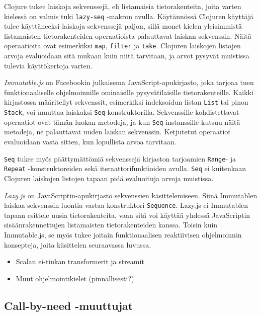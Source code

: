 Clojure tukee laiskoja sekvenssejä, eli listamaisia tietorakenteita, joita varten kielessä on valmis tuki \verb!lazy-seq! -makron avulla. Käytännössä Clojuren käyttäjä tulee käyttäneeksi laiskoja sekvenssejä paljon, sillä monet kielen yleisimmistä listamaisten tietorakenteiden operaatioista palauttavat laiskan sekvenssin. Näitä operaatioita ovat esimerkiksi \verb!map!, \verb!filter! ja \verb!take!. Clojuren laiskojen listojen arvoja evaluoidaan sitä mukaan kuin niitä tarvitaan, ja arvot pysyvät muistissa tulevia käyttökertoja varten.

\textit{Immutable.js} on Facebookin julkaisema JavaScript-apukirjasto, joka tarjoaa tuen funktionaaliselle ohjelmoinnille ominaisille pysyvätilaisille tietorakenteille. Kaikki kirjastossa määritellyt sekvenssit, esimerkiksi indeksoidun listan \verb!List! tai pinon \verb!Stack!, voi muuttaa laiskaksi \verb!Seq!-konstruktorilla. Sekvenssille kohdistettavat operaatiot ovat tämän luokan metodeja, ja kun \verb!Seq!-instanssille kutsuu näitä metodeja, ne palauttavat uuden laiskan sekvenssin. Ketjutetut operaatiot evaluoidaan vasta sitten, kun lopullista arvoa tarvitaan.

\begin{sloppypar}
\verb!Seq! tukee myös päättymättömiä sekvenssejä kirjaston tarjoamien \verb!Range!- ja \verb!Repeat! \mbox{-konstruktoreiden} sekä iteraattorifunktioiden avulla. \verb!Seq! ei kuitenkaan Clojuren laiskojen listojen tapaan pidä evaluoituja arvoja muistissa.
\end{sloppypar}

\textit{Lazy.js} on JavaScriptin-apukirjasto sekvenssien käsittelemiseen. Siinä Immutablen laiskaa sekvenssin luontia vastaa konstruktori \verb!Sequence!. Lazy.js ei Immutablen tapaan esittele uusia tietorakenteita, vaan sitä voi käyttää yhdessä JavaScriptin sisäänrakennettujen listamaisten tietorakenteiden kanssa. Toisin kuin Immutable.js, se myös tukee joitain funktionaalisen reaktiivisen ohjelmoinnin konsepteja, joita käsittelen seuraavassa luvussa.

\begin{itemize}
	\item Scalan ei-tiukan transformerit ja streamit
	\item Muut ohjelmointikielet (pinnallisesti?)
\end{itemize}

\subsection{Call-by-need -muuttujat}

